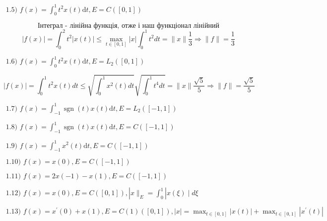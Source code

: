 \begin{tcolorbox}
    $
    \text { 1.5) } f(x)=\int_{0}^{1} t^{2} x(t) \mathrm{d} t, E=C([0,1]) 
    $

    $$ \text{Інтеграл - лінійна функція, отже і наш функціонал лінійний} $$
    $$ |f(x)| = \int_0^2 t^2 |x(t)| \le \max_{t \in[0,1]}|x|\int_{0}^{1}t^2dt = 
    \|x\| \frac{1}{3} \Rightarrow \|f\| = \frac{1}{3}$$

    $
    \text { 1.6) } f(x)=\int_{0}^{1} t^{2} x(t) \mathrm{d} t, E=L_{2}([0,1]) 
    $

    $$ |f(x)| = \int_0^1t^2x(t)dt \le 
    \sqrt{\int_0^1x^2(t)dt} \sqrt{\int_0^1t^4dt} = 
    \|x\|\frac{\sqrt{5}}{5} \Rightarrow \|f\|=\frac{\sqrt{5}}{5}$$

    $
    \text { 1.7) } f(x)=\int_{-1}^{1} \operatorname{sgn}(t) x(t) \mathrm{d} t, E=L_{2}([-1,1]) 
    $

    $
    \text { 1.8) } f(x)=\int_{-1}^{1} \operatorname{sgn}(t) x(t) \mathrm{d} t, E=C([-1,1]) 
    $

    $
    \text { 1.9) } f(x)=\int_{-1}^{1} x^{2}(t) \mathrm{d} t, E=C([-1,1]) 
    $

    $
    \text { 1.10) } f(x)=x(0), E=C([-1,1]) 
    $

    $
    \text { 1.11) } f(x)=2 x(-1)-x(1), E=C([-1,1]) 
    $

    $
    \text { 1.12) } f(x)=x(0), E=C([0,1]),|x \|_{E}=\int_{0}^{1}| x(\xi) \mid d \xi 
    $

    $
    \text { 1.13) } f(x)=x^{\prime}(0)+x(1), E=C(1)([0,1]),|x|=\max _{t \in[0,1]}|x(t)|+\max _{t \in[0,1]}|x^{\prime}(t)|
    $


\end{tcolorbox}